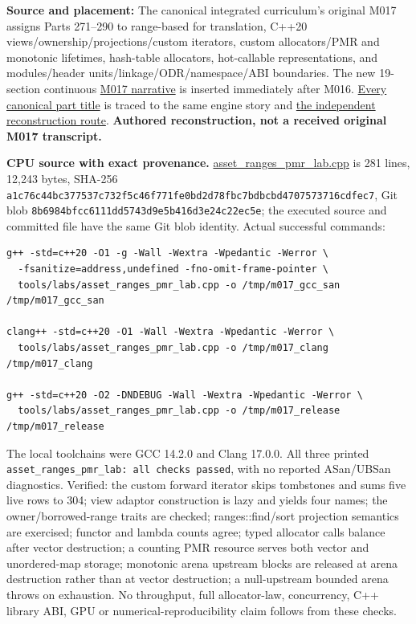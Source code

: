 \textbf{Source and placement:} The canonical integrated curriculum's original M017 assigns Parts 271--290 to range-based for translation, C++20 views/ownership/projections/custom iterators, custom allocators/PMR and monotonic lifetimes, hash-table allocators, hot-callable representations, and modules/header units/linkage/ODR/namespace/ABI boundaries. The new 19-section continuous \hyperref[01-foundations-i-ch006-from-copying-every-asset-report-to-a-lazy-allocatable-separately-compiled-query-service]{M017 narrative} is inserted immediately after M016. \hyperref[appendix-fd090d982a15-m017-parts-271290-lazy-asset-queries-allocation-lifetimes-and-compiled-api-boundaries]{Every canonical part title} is traced to the same engine story and \hyperref[appendix-960160274237-from-borrowed-reports-to-module-boundaries-m017-reconstruction]{the independent reconstruction route}. \textbf{Authored reconstruction, not a received original M017 transcript.}

\textbf{CPU source with exact provenance.} \hyperref[source-file-a1c76c44bc377537c732f5c4]{asset\_ranges\_pmr\_lab.cpp} is 281 lines, 12,243 bytes, SHA-256 \texttt{a1c76c44bc377537c732f5c46f771fe0bd2d78fbc7bdbcbd4707573716cdfec7}, Git blob \texttt{8b6984bfcc6111dd5743d9e5b416d3e24c22ec5e}; the executed source and committed file have the same Git blob identity. Actual successful commands:

\begin{verbatim}
g++ -std=c++20 -O1 -g -Wall -Wextra -Wpedantic -Werror \
  -fsanitize=address,undefined -fno-omit-frame-pointer \
  tools/labs/asset_ranges_pmr_lab.cpp -o /tmp/m017_gcc_san
/tmp/m017_gcc_san

clang++ -std=c++20 -O1 -Wall -Wextra -Wpedantic -Werror \
  tools/labs/asset_ranges_pmr_lab.cpp -o /tmp/m017_clang
/tmp/m017_clang

g++ -std=c++20 -O2 -DNDEBUG -Wall -Wextra -Wpedantic -Werror \
  tools/labs/asset_ranges_pmr_lab.cpp -o /tmp/m017_release
/tmp/m017_release
\end{verbatim}

The local toolchains were GCC 14.2.0 and Clang 17.0.0. All three printed \texttt{asset\_ranges\_pmr\_lab:\ all\ checks\ passed}, with no reported ASan/UBSan diagnostics. Verified: the custom forward iterator skips tombstones and sums five live rows to 304; view adaptor construction is lazy and yields four names; the owner/borrowed-range traits are checked; ranges::find/sort projection semantics are exercised; functor and lambda counts agree; typed allocator calls balance after vector destruction; a counting PMR resource serves both vector and unordered-map storage; monotonic arena upstream blocks are released at arena destruction rather than at vector destruction; a null-upstream bounded arena throws on exhaustion. No throughput, full allocator-law, concurrency, C++ library ABI, GPU or numerical-reproducibility claim follows from these checks.

